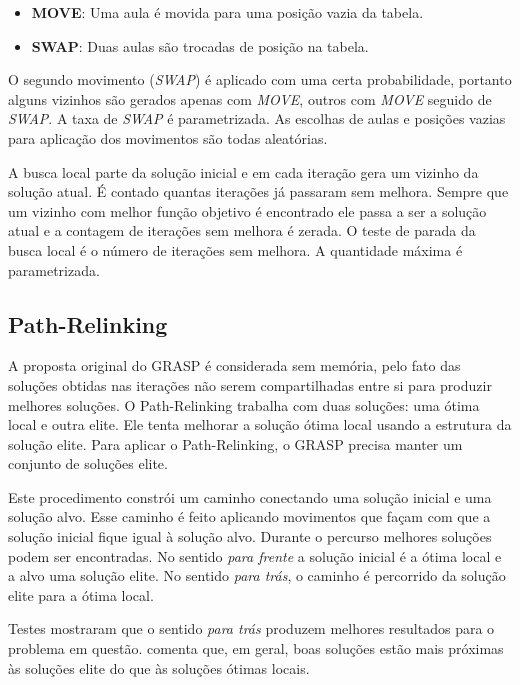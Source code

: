 \documentclass[11pt]{article}
\begin{document}
\begin{itemize}
\item \textbf{MOVE}: Uma aula é movida para uma posição vazia da tabela.
\item \textbf{SWAP}: Duas aulas são trocadas de posição na tabela.
\end{itemize}

O segundo movimento (\textit{SWAP}) é aplicado com uma certa probabilidade, portanto alguns vizinhos são gerados apenas com \textit{MOVE}, outros com \textit{MOVE} seguido de \textit{SWAP}. A taxa de \textit{SWAP} é parametrizada. As escolhas de aulas e posições vazias para aplicação dos movimentos são todas aleatórias.

A busca local parte da solução inicial e em cada iteração gera um vizinho da solução atual. É contado quantas iterações já passaram sem melhora. Sempre que um vizinho com melhor função objetivo é encontrado ele passa a ser a solução atual e a contagem de iterações sem melhora é zerada. O teste de parada da busca local é o número de iterações sem melhora. A quantidade máxima é parametrizada. 

\subsection{Path-Relinking}

A proposta original do GRASP é considerada sem memória, pelo fato das soluções obtidas nas iterações não serem compartilhadas entre si para produzir melhores soluções. O Path-Relinking trabalha com duas soluções: uma ótima local e outra elite. Ele tenta melhorar a solução ótima local usando a estrutura da solução elite. Para aplicar o Path-Relinking, o GRASP precisa manter um conjunto de soluções elite.

Este procedimento constrói um caminho conectando uma solução inicial e uma solução alvo. Esse caminho é feito aplicando movimentos que façam com que a solução inicial fique igual à solução alvo. Durante o percurso melhores soluções podem ser encontradas. No sentido \textit{para frente} a solução inicial é a ótima local e a alvo uma solução elite. No sentido \textit{para trás}, o caminho é percorrido da solução elite para a ótima local.

Testes mostraram que o sentido \textit{para trás} produzem melhores resultados para o problema em questão. \cite{grasp_resende_ribeiro} comenta que, em geral, boas soluções estão mais próximas às soluções elite do que às soluções ótimas locais.
\end{document}

